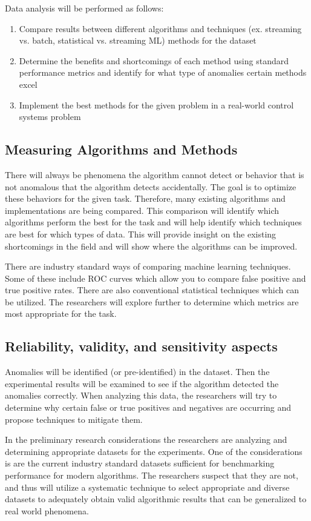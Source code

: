Data  analysis will be performed as follows:
\begin{enumerate}[leftmargin=2cm]
    \item Compare results between different algorithms and techniques (ex. streaming vs. batch, statistical vs. streaming ML) methods for the dataset 
    \item Determine the benefits and shortcomings of each method using standard performance metrics and identify for what type of anomalies certain methods excel
    \item Implement the best methods for the given problem in a real-world control systems problem
\end{enumerate}

\subsection{Measuring Algorithms and Methods}

There will always be phenomena the algorithm cannot detect or behavior that is not anomalous that the algorithm detects accidentally. The goal is to optimize these behaviors for the given task. Therefore, many existing algorithms and implementations are being compared. This comparison will identify which algorithms perform the best for the task and will help identify which techniques are best for which types of data. This will provide insight on the existing shortcomings in the field and will show where the algorithms can be improved.

There are industry standard ways of comparing machine learning techniques. Some of these include ROC curves which allow you to compare false positive and true positive rates. There are also conventional statistical techniques which can be utilized. The researchers will explore further to determine which metrics are most appropriate for the task.

\subsection{Reliability, validity, and sensitivity aspects}
Anomalies will be identified (or pre-identified) in the dataset. Then the experimental results will be examined to see if the algorithm detected the anomalies correctly. When analyzing this data, the researchers will try to determine why certain false or true positives and negatives are occurring and propose techniques to mitigate them.

In the preliminary research considerations the researchers are analyzing and determining appropriate datasets for the experiments. One of the considerations is are the current industry standard datasets sufficient for benchmarking performance for modern algorithms. The researchers suspect that they are not, and thus will utilize a systematic technique to select appropriate and diverse datasets to adequately obtain valid algorithmic results that can be generalized to real world phenomena. 


